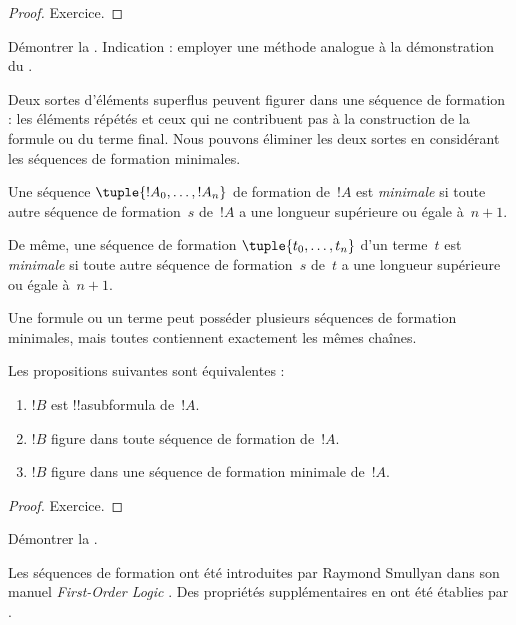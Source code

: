\documentclass[../../../include/open-logic-section]{subfiles}
\begin{document}
\begin{proof}
Exercice.
\end{proof}

\begin{prob}
Démontrer la .
Indication : employer une méthode analogue à la démonstration du
.
\end{prob}

Deux sortes d'éléments superflus peuvent figurer dans une séquence de
formation : les éléments répétés et ceux qui ne contribuent pas à la
construction de la formule ou du terme final. Nous pouvons éliminer
les deux sortes en considérant les séquences de formation minimales.

\begin{defn}
Une séquence $\tuple{!A_0, \ldots, !A_n}$ de formation de~$!A$
est \emph{minimale} si toute autre séquence de
formation~$s$ de~$!A$ a une longueur supérieure ou égale à~$n+1$.

De même, une séquence de formation $\tuple{t_0, \ldots, t_n}$
d'un terme~$t$ est \emph{minimale} si toute autre séquence de
formation~$s$ de~$t$ a une longueur supérieure ou égale à~$n+1$.
\end{defn}

Une formule ou un terme peut posséder plusieurs séquences de formation
minimales, mais toutes contiennent exactement les mêmes chaînes.

\begin{prop}
Les propositions suivantes sont équivalentes :
\begin{enumerate}
    \item $!B$ est !!a{subformula} de~$!A$.
    \item $!B$ figure dans toute séquence de formation de~$!A$.
    \item $!B$ figure dans une séquence de formation minimale de~$!A$.
\end{enumerate}
\end{prop}

\begin{proof}
Exercice.
\end{proof}

\begin{prob}
Démontrer la .
\end{prob}

\begin{history}
Les séquences de formation ont été introduites par Raymond Smullyan
dans son manuel \emph{First-Order Logic} \citep{Smullyan1968}.
Des propriétés supplémentaires en ont été établies par
\citet{Zuckerman1973}.
\end{history}
\end{document}
